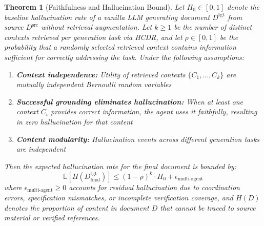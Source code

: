 \documentclass{ieeeaccess}
\newtheorem{theorem}{Theorem}
\begin{document}
\begin{theorem}[Faithfulness and Hallucination Bound]
\label{thm:faithfulness}
Let \(H_0 \in [0,1]\) denote the baseline hallucination rate of a vanilla LLM generating document \(D^{\text{tgt}}\) from source \(D^{\text{src}}\) without retrieval augmentation. Let \(k \geq 1\) be the number of distinct contexts retrieved per generation task via HCDR, and let \(\rho \in [0,1]\) be the probability that a randomly selected retrieved context contains information sufficient for correctly addressing the task. Under the following assumptions:
\begin{enumerate}
\item \textbf{Context independence:} Utility of retrieved contexts \(\{C_1, \ldots, C_k\}\) are mutually independent Bernoulli random variables
\item \textbf{Successful grounding eliminates hallucination:} When at least one context \(C_i\) provides correct information, the agent uses it faithfully, resulting in zero hallucination for that content
\item \textbf{Content modularity:} Hallucination events across different generation tasks are independent
\end{enumerate}

Then the expected hallucination rate for the final document is bounded by:
\begin{equation}
\mathbb{E}[H(D^{\text{tgt}}_{\text{final}})] \leq (1-\rho)^k \cdot H_0 + \epsilon_{\text{multi-agent}}
\label{eq:faithfulness-bound}
\end{equation}
where \(\epsilon_{\text{multi-agent}} \geq 0\) accounts for residual hallucination due to coordination errors, specification mismatches, or incomplete verification coverage, and \(H(D)\) denotes the proportion of content in document \(D\) that cannot be traced to source material or verified references.
\end{theorem}
\end{document}
